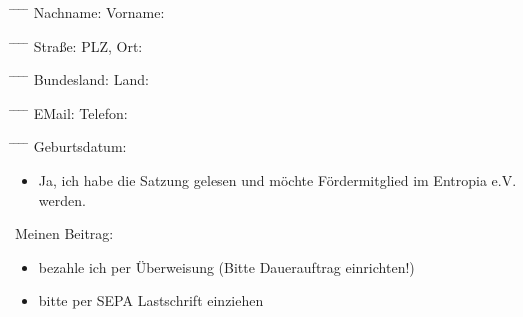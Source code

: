 \documentclass{scrartcl}
\begin{document}
\begin{tabbing}
\hspace*{3cm}\= \hspace*{6cm} \= \hspace*{2cm} \= \hspace*{4cm} \= \kill
Nachname: \> \underline{\hspace{150pt}} \> Vorname: \>  \underline{\hspace{150pt}}
\end{tabbing}
\begin{tabbing}
\hspace*{3cm}\= \hspace*{6cm} \= \hspace*{2cm} \= \hspace*{4cm} \= \kill
Stra{\ss}e: \> \underline{\hspace{150pt}} \> PLZ, Ort: \> \underline{\hspace{150pt}}
\end{tabbing}
\begin{tabbing}
\hspace*{3cm}\= \hspace*{6cm} \= \hspace*{2cm} \= \hspace*{4cm} \= \kill
Bundesland: \> \underline{\hspace{150pt}} \> Land: \> \underline{\hspace{150pt}}
\end{tabbing}
\begin{tabbing}
\hspace*{3cm}\= \hspace*{6cm} \= \hspace*{2cm} \= \hspace*{4cm} \= \kill
EMail: \> \underline{\hspace{150pt}} \> Telefon: \> \underline{\hspace{150pt}}
\end{tabbing}
\begin{tabbing}
\hspace*{3cm}\= \hspace*{6cm} \= \hspace*{2cm} \= \hspace*{4cm} \= \kill
Geburtsdatum: \> \underline{\hspace{150pt}} \>
\end{tabbing}
\begin{itemize}
\item[\Square] Ja, ich habe die Satzung gelesen und m\"ochte Fördermitglied im Entropia e.V. werden.
\end{itemize}
Meinen Beitrag:
\begin{itemize}
\item[\Square] bezahle ich per \"Uberweisung (Bitte Dauerauftrag einrichten!)
\item[\Square] bitte per SEPA Lastschrift einziehen
\end{itemize}
\addvspace{0.4cm}
\end{document}
